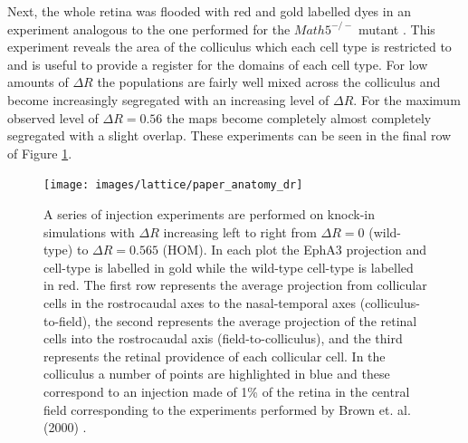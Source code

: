 Next, the whole retina was flooded with red and gold labelled dyes in an experiment analogous to the one performed for the $Math5^{-/-}$ mutant \cite{Triplett2011-jk}. This experiment reveals the area of the colliculus which each cell type is restricted to and is useful to provide a register for the domains of each cell type. For low amounts of $\Delta R$ the populations are fairly well mixed across the colliculus and become increasingly segregated with an increasing level of $\Delta R$. For the maximum observed level of $\Delta R=0.56$ the maps become completely almost completely segregated with a slight overlap. These experiments can be seen in the final row of Figure \ref{fig:antomicalEphA3}.
\begin{landscape}
\begin{figure}
	\centering
	\texttt{[image: images/lattice/paper\_anatomy\_dr]}
	\def\c{A series of injection experiments are performed on knock-in simulations with $\Delta R$ increasing left to right from $\Delta R=0$ (wild-type) to $\Delta R=0.565$ (HOM). }
	\caption[\c]{\c In each plot the EphA3 projection and cell-type is labelled in gold while the wild-type cell-type is labelled in red. The first row represents the average projection from collicular cells in the rostrocaudal axes to the nasal-temporal axes (colliculus-to-field), the second represents the average projection of the retinal cells into the rostrocaudal axis (field-to-colliculus), and the third represents the retinal providence of each collicular cell. In the colliculus a number of points are highlighted in blue and these correspond to an injection made of 1\% of the retina in the central field corresponding to the experiments performed by Brown et. al. (2000) \cite{Brown2000-da}.} \label{fig:antomicalEphA3}
\end{figure}
\end{landscape}
